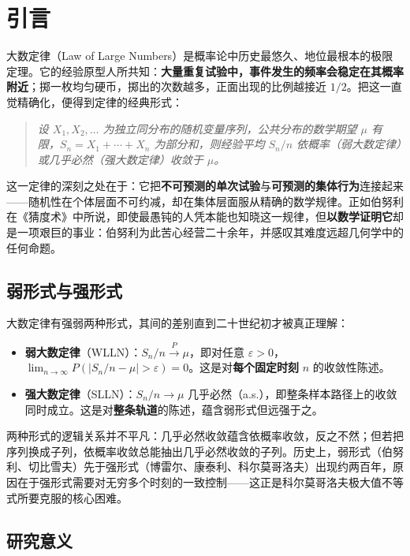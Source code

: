 \section{引言}\label{sec:introduction}

大数定律（Law of Large Numbers）是概率论中历史最悠久、地位最根本的极限定理。它的经验原型人所共知：\textbf{大量重复试验中，事件发生的频率会稳定在其概率附近}；掷一枚均匀硬币，掷出的次数越多，正面出现的比例越接近 $1/2$。把这一直觉精确化，便得到定律的经典形式：

\begin{quote}
    \textit{设 $X_1, X_2, \dots$ 为独立同分布的随机变量序列，公共分布的数学期望 $\mu$ 有限，$S_n = X_1 + \cdots + X_n$ 为部分和，则经验平均 $S_n/n$ 依概率（弱大数定律）或几乎必然（强大数定律）收敛于 $\mu$。}
\end{quote}

这一定律的深刻之处在于：它把\textbf{不可预测的单次试验}与\textbf{可预测的集体行为}连接起来——随机性在个体层面不可约减，却在集体层面服从精确的数学规律。正如伯努利在《猜度术》中所说，即使最愚钝的人凭本能也知晓这一规律，但\textbf{以数学证明它}却是一项艰巨的事业：伯努利为此苦心经营二十余年，并感叹其难度远超几何学中的任何命题。

\subsection{弱形式与强形式}

大数定律有强弱两种形式，其间的差别直到二十世纪初才被真正理解：

\begin{itemize}
    \item \textbf{弱大数定律}（WLLN）：$S_n/n \xrightarrow{P} \mu$，即对任意 $\varepsilon > 0$，$\lim_{n\to\infty} P\left(\left|S_n/n - \mu\right| > \varepsilon\right) = 0$。这是对\textbf{每个固定时刻} $n$ 的收敛性陈述。
    \item \textbf{强大数定律}（SLLN）：$S_n/n \to \mu$ 几乎必然（a.s.），即整条样本路径上的收敛同时成立。这是对\textbf{整条轨道}的陈述，蕴含弱形式但远强于之。
\end{itemize}

两种形式的逻辑关系并不平凡：几乎必然收敛蕴含依概率收敛，反之不然；但若把序列换成子列，依概率收敛总能抽出几乎必然收敛的子列。历史上，弱形式（伯努利、切比雪夫）先于强形式（博雷尔、康泰利、科尔莫哥洛夫）出现约两百年，原因在于强形式需要对无穷多个时刻的一致控制——这正是科尔莫哥洛夫极大值不等式所要克服的核心困难。

\subsection{研究意义}

